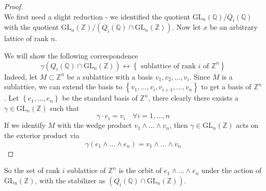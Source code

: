 \documentclass[12pt]{article} %
\begin{document}
\begin{proof}
    \hfill \\
    We first need a slight reduction - we identified the quotient $\text{GL}_n(\mathbb{Q})/Q_i(\mathbb{Q})$ with
    the quotient $\text{GL}_n(\mathbb{Z})/(Q_i(\mathbb{Q}) \cap \text{GL}_n(\mathbb{Z})) $. Now let $x$ be an arbitrary lattice of rank $n$.

    We will show the following correspondence
    \[ \gamma(Q_i(\mathbb{Q}) \cap \text{GL}_n(\mathbb{Z})) \longleftrightarrow \left\lbrace \text{ sublattice of rank $i$ of $\mathbb{Z}^n$}\right\rbrace\]
    Indeed, let $M \subset \mathbb{Z}^n$ be a sublattice with a basis $v_1,v_2,\ldots,v_i$. Since $M$ is a sublattice, we can extend the basis to $
        \left\lbrace v_1,\ldots,v_i,v_{i+1},\ldots,v_n\right\rbrace$ to get a basis of $\mathbb{Z}^n$. Let $\left\lbrace e_1,\ldots,e_n\right\rbrace$ be the standard basis
    of $\mathbb{Z}^n$, there clearly there exsists a $\gamma \in \text{GL}_n(\mathbb{Z})$ such that
    \[\gamma \cdot e_i = v_i \quad \forall i =1,\ldots,n\]
    If we identify $M$ with the wedge product $v_1\wedge \ldots \wedge v_n$, then $ \gamma \in \text{GL}_n(\mathbb{Z})$ acts on the exterior product via
    \[\gamma (e_1\wedge \ldots \wedge e_n) = v_1\wedge \ldots \wedge v_n\]
\end{proof}
So the set of rank $i$ sublattice of $\mathbb{Z}^n$ is the orbit of $e_1\wedge \ldots \wedge e_n$
under the action of $ \text{GL}_n(\mathbb{Z})$, with the stabilizer as $(Q_i(\mathbb{Q}) \cap \text{GL}_n(\mathbb{Z}))$.
\end{document}
